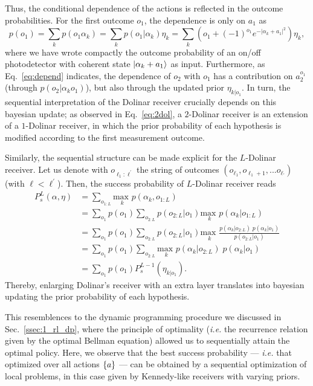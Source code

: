 Thus, the conditional dependence of the actions is reflected in the outcome probabilities. For the first outcome $o_1$, the dependence is only on $a_1$ as
\begin{equation}
p(o_1) = \sum_k p(o_1 \alpha_k) = \sum_k p(o_1|\alpha_k) \eta_k = \sum_k (o_1 + (-1)^{o_1} e^{-|\alpha_k + a_1|^2})\eta_k,
\end{equation}
where we have wrote compactly the outcome probability of an on/off photodetector with coherent state $\ket{\alpha_k + a_1}$ as input. Furthermore, as Eq.~\ref{eq:depend} indicates, the dependence of $o_2$ with $o_1$ has a contribution on $a_2^{o_1}$ (through $p(o_2|\alpha_k o_1)$), but also through the updated prior $\eta_{k|o_1}$. In turn, the sequential interpretation of the Dolinar receiver crucially depends on this bayesian update; as observed in Eq.~\ref{eq:2dol}, a $2$-Dolinar receiver is an extension of a $1$-Dolinar receiver, in which the prior probability of each hypothesis is modified according to the first measurement outcome.

Similarly, the sequential structure can be made explicit for the $L$-Dolinar receiver. Let us denote with $o_{\ell_1:\ell^{'}}$ the string of outcomes $(o_{\ell_1}, o_{\ell_1 +1}, ... o_{\ell_{'}})$ (with $\ell < \ell^{'}$). Then, the success probability of $L$-Dolinar receiver reads
\begin{align}\label{eq:Ldol}
P_s^{L}(\alpha,\eta) &= \sum_{o_{1:L}}  \underset{k}{\text{max }} p(\alpha_k, o_{1:L})  \\
&= \sum_{o_1} p(o_1) \sum_{o_{2:L}} p(o_{2:L}|o_1)\underset{k}{\text{max }} p(\alpha_k| o_{1:L}) \\
&= \sum_{o_1} p(o_1) \sum_{o_{2:L}} p(o_{2:L}|o_1)\underset{k}{\text{max }} \frac{p(\alpha_k| o_{2:L})\; p(\alpha_k| o_{1})}{p(o_{2:L}|o_1)} \\
&= \sum_{o_1} p(o_1) \sum_{o_{2:L}} \underset{k}{\text{max }} p(\alpha_k| o_{2:L})\; p(\alpha_k| o_{1}) \\
&= \sum_{o_1} p(o_1) P_s^{L-1}(\eta_{k|o_1}).
\end{align}
Thereby, enlarging Dolinar's receiver with an extra layer translates into bayesian updating the prior probability of each hypothesis.

This resemblences to the dynamic programming procedure we discussed in Sec.~\ref{ssec:1_rl_dp}, where the principle of optimality (\textit{i.e.} the recurrence relation given by the optimal Bellman equation) allowed us to sequentially attain the optimal policy. Here, we observe that the best success probability --- \textit{i.e.} that optimized over all actions $\lbrace a\rbrace$ --- can be obtained by a sequential optimization of local problems, in this case given by Kennedy-like receivers with varying priors.

